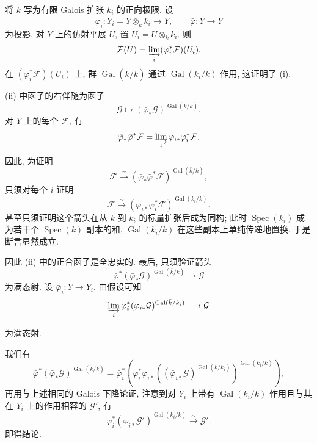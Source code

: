 将 $\bar k$ 写为有限 Galois 扩张 $k_i$ 的正向极限. 设
\begin{equation*}
\varphi_i:Y_i=Y\otimes_k k_i\longrightarrow Y,
\qquad
\bar\varphi:\bar Y\longrightarrow Y
\end{equation*}
为投影. 对 $Y$ 上的仿射平展 $U$, 置 $U_i=U\otimes_k k_i$. 则
\begin{equation*}
\bar{\mathcal F}(\bar U)
=\varinjlim_i(\varphi_i^*\mathcal F)(U_i).
\end{equation*}
在 $(\varphi_i^*\mathcal F)(U_i)$ 上, 群 $\operatorname{Gal}(\bar k/k)$ 通过 $\operatorname{Gal}(k_i/k)$ 作用, 这证明了 (i).

(ii) 中函子的右伴随为函子
\begin{equation*}
\mathcal G\longmapsto
(\bar\varphi_*\mathcal G)^{\operatorname{Gal}(\bar k/k)}.
\end{equation*}
对 $Y$ 上的每个 $\mathcal F$, 有
\begin{equation*}
\bar\varphi_*\bar\varphi^*\mathcal F
=\varinjlim_i\varphi_{i*}\varphi_i^*\mathcal F.
\end{equation*}
因此, 为证明
\begin{equation*}
\mathcal F\xrightarrow{\sim}
(\bar\varphi_*\bar\varphi^*\mathcal F)^{
  \operatorname{Gal}(\bar k/k)},
\end{equation*}
只须对每个 $i$ 证明
\begin{equation*}
\mathcal F\xrightarrow{\sim}
(\varphi_{i*}\varphi_i^*\mathcal F)^{
  \operatorname{Gal}(k_i/k)}.
\end{equation*}
甚至只须证明这个箭头在从 $k$ 到 $k_i$ 的标量扩张后成为同构; 此时 $\operatorname{Spec}(k_i)$ 成为若干个 $\operatorname{Spec}(k)$ 副本的和, $\operatorname{Gal}(k_i/k)$ 在这些副本上单纯传递地置换, 于是断言显然成立.

因此 (ii) 中的正合函子是全忠实的. 最后, 只须验证箭头
\begin{equation*}
\bar\varphi^*(\bar\varphi_*\mathcal G)^{
  \operatorname{Gal}(\bar k/k)}\longrightarrow\mathcal G
\end{equation*}
为满态射. 设 $\bar\varphi_i:\bar Y\longrightarrow Y_i$. 由假设可知
\begin{equation*}
\varinjlim_i
\bar\varphi_i^*(\bar\varphi_{i*}\mathcal G)^{
  \operatorname{Gal}(\bar k/k_i)}
\longrightarrow\mathcal G
\end{equation*}

为满态射.

我们有
\begin{equation*}
\bar\varphi^*(\bar\varphi_*\mathcal G)^{
  \operatorname{Gal}(\bar k/k)}
=
\bar\varphi_i^*\!\left(
  \varphi_i^*\varphi_{i*}
  \left((\bar\varphi_{i*}\mathcal G)^{
    \operatorname{Gal}(\bar k/k_i)}\right)^{
    \operatorname{Gal}(k_i/k)}
\right),
\end{equation*}
再用与上述相同的 Galois 下降论证, 注意到对 $Y_i$ 上带有 $\operatorname{Gal}(k_i/k)$ 作用且与其在 $Y_i$ 上的作用相容的 $\mathcal G'$, 有
\begin{equation*}
\varphi_i^*(\varphi_{i*}\mathcal G')^{
  \operatorname{Gal}(k_i/k)}
\xrightarrow{\sim}\mathcal G'.
\end{equation*}
即得结论.
